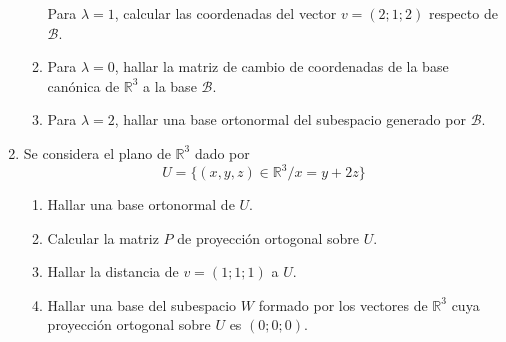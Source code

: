 \documentclass[12pt]{article}
\begin{document}
\begin{enumerate}
\begin{enumerate}
    Para $\lambda = 1$, calcular las coordenadas del vector $v = (2; 1; 2)$ respecto de $\mathcal{B}$.
    \item Para $\lambda = 0$, hallar la matriz de cambio de coordenadas de la base canónica de $\mathbb{R}^3$ a la base $\mathcal{B}$.
    \item Para $\lambda = 2$, hallar una base ortonormal del subespacio generado por $\mathcal{B}$.
  \end{enumerate}
  \item Se considera el plano de $\mathbb{R}^3$ dado por
  $$
  U=\{(x,y,z)\in\mathbb{R}^3 / x=y+2z\}
  $$
  \begin{enumerate}
    \item Hallar una base ortonormal de $U$.
    \item Calcular la matriz $P$ de proyección ortogonal sobre $U$.
    \item Hallar la distancia de $v = (1; 1; 1)$ a $U$.
    \item Hallar una base del subespacio $W$ formado por los vectores de $\mathbb{R}^3$ cuya proyección ortogonal sobre $U$ es $(0; 0; 0)$.
  \end{enumerate}
\end{enumerate}
\end{document}
